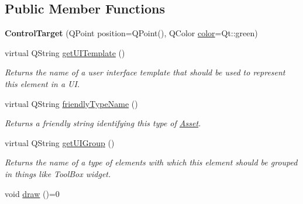 \subsection*{Public Member Functions}
\begin{DoxyCompactItemize}
\item 
\hypertarget{class_picto_1_1_control_target_af7634d919c492efa95f9e71dbdfa15ad}{{\bfseries Control\-Target} (Q\-Point position=Q\-Point(), Q\-Color \hyperlink{struct_picto_1_1_visual_element_a45c3042c969717eb2ab60373369c7de7}{color}=Qt\-::green)}\label{class_picto_1_1_control_target_af7634d919c492efa95f9e71dbdfa15ad}

\item 
\hypertarget{class_picto_1_1_control_target_a5af5446a825b50dd96f4fbedb1ec0fb3}{virtual Q\-String \hyperlink{class_picto_1_1_control_target_a5af5446a825b50dd96f4fbedb1ec0fb3}{get\-U\-I\-Template} ()}\label{class_picto_1_1_control_target_a5af5446a825b50dd96f4fbedb1ec0fb3}

\begin{DoxyCompactList}\small\item\em Returns the name of a user interface template that should be used to represent this element in a U\-I. \end{DoxyCompactList}\item 
virtual Q\-String \hyperlink{class_picto_1_1_control_target_a4a46d2b0d80b07a439be0fcaa84dc18d}{friendly\-Type\-Name} ()
\begin{DoxyCompactList}\small\item\em Returns a friendly string identifying this type of \hyperlink{class_picto_1_1_asset}{Asset}. \end{DoxyCompactList}\item 
\hypertarget{class_picto_1_1_control_target_ac516e3849947ea0359a8e0f998f0f601}{virtual Q\-String \hyperlink{class_picto_1_1_control_target_ac516e3849947ea0359a8e0f998f0f601}{get\-U\-I\-Group} ()}\label{class_picto_1_1_control_target_ac516e3849947ea0359a8e0f998f0f601}

\begin{DoxyCompactList}\small\item\em Returns the name of a type of elements with which this element should be grouped in things like Tool\-Box widget. \end{DoxyCompactList}\item 
\hypertarget{class_picto_1_1_control_target_aef3dae260b39bb05fbfdbcf4ff396102}{void \hyperlink{class_picto_1_1_control_target_aef3dae260b39bb05fbfdbcf4ff396102}{draw} ()=0}\label{class_picto_1_1_control_target_aef3dae260b39bb05fbfdbcf4ff396102}


\end{DoxyCompactItemize}
